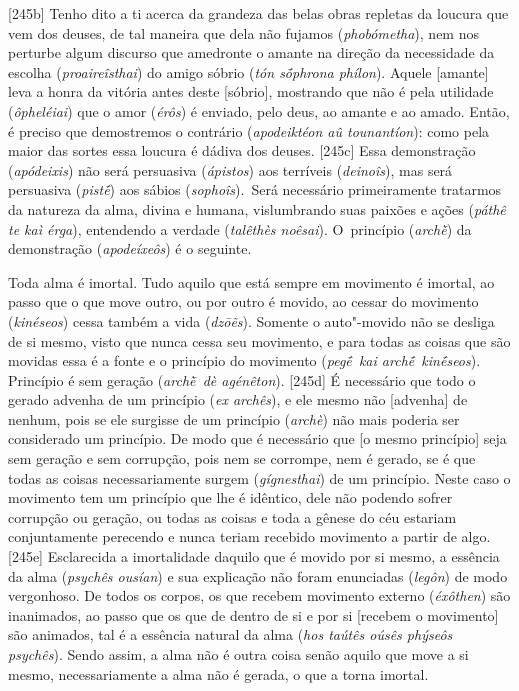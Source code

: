 [245b] Tenho dito a ti acerca da grandeza das belas obras repletas
da loucura que vem dos deuses, de tal maneira que dela não fujamos
(\emph{phobómetha}), nem nos perturbe algum discurso que amedronte o
amante na direção da necessidade da escolha (\emph{proaireîsthai}) do
amigo sóbrio (\emph{tón sṓphrona phílon}). Aquele [amante] leva a
honra da vitória antes deste [sóbrio], mostrando que não é pela
utilidade (\emph{ôpheléiai}) que o amor (\emph{érôs}) é enviado, pelo
deus, ao amante e ao amado. Então, é preciso que demostremos o contrário
(\emph{apodeiktéon aû tounantíon}): como pela maior das sortes essa
loucura é dádiva dos deuses. [245c] Essa demonstração
(\emph{apódeixis}) não será persuasiva (\emph{ápistos}) aos terríveis
(\emph{deinoîs}), mas será persuasiva (\emph{pistḗ}) aos sábios
(\emph{sophoîs}).~Será necessário primeiramente tratarmos da natureza da
alma, divina e humana, vislumbrando suas paixões e ações (\emph{páthê te
kaì érga}), entendendo a verdade (\emph{talêthès noêsai}). O~princípio
(\emph{archḕ}) da demonstração (\emph{apodeíxeôs}) é o seguinte.

Toda alma é imortal. Tudo aquilo que está sempre em movimento é imortal,
ao passo que o que move outro, ou por outro é movido, ao cessar do
movimento (\emph{kinéseos}) cessa também a vida (\emph{dzōẽs}). Somente
o auto"-movido não se desliga de si mesmo, visto que nunca cessa seu
movimento, e para todas as coisas que são movidas essa é a fonte e o
princípio do movimento (\emph{pegḗ~kai archḗ~kinḗseos}). Princípio é sem
geração (\emph{archḕ~dè agénêton}). [245d] É necessário que todo o
gerado advenha de um princípio (\emph{ex archês}), e ele mesmo não
[advenha] de nenhum, pois se ele surgisse de um princípio
(\emph{archè}) não mais poderia ser considerado um princípio. De modo
que é necessário que [o mesmo princípio] seja sem geração e sem
corrupção, pois nem se corrompe, nem é gerado, se é que todas as coisas
necessariamente surgem (\emph{gígnesthai}) de um princípio. Neste caso o
movimento tem um princípio que lhe é idêntico, dele não podendo sofrer
corrupção ou geração, ou todas as coisas e toda a gênese do céu estariam
conjuntamente perecendo e nunca teriam recebido movimento a partir de
algo. [245e] Esclarecida a imortalidade daquilo que é movido por si
mesmo, a essência da alma (\emph{psychês ousían}) e sua explicação não
foram enunciadas (\emph{legôn}) de modo vergonhoso. De todos os corpos,
os que recebem movimento externo (\emph{éxôthen}) são inanimados, ao
passo que os que de dentro de si e por si [recebem o movimento] são
animados, tal é a essência natural da alma (\emph{hos taútês oúsês
phýseôs psychês}). Sendo assim, a alma não é outra coisa senão aquilo
que move a si mesmo, necessariamente a alma não é gerada, o que a torna
imortal.

